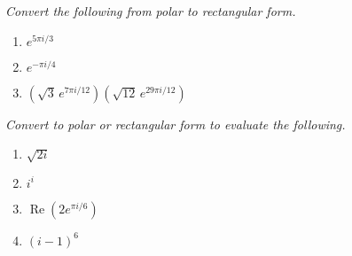 \documentclass[11pt]{article}
\newcommand{\re}{\operatorname{Re}}
\begin{document}
\noindent
\textit{Convert the following from polar to rectangular form.}
\begin{multicols}{3}
\begin{enumerate}
\setcounter{enumi}{\theenumCount}
\item $e^{5\pi i/3}$ %
\item $e^{-\pi i /4}$ %
\item $(\sqrt{3}\, e^{7\pi i /12}) (\sqrt{12}\, e^{29 \pi i/ 12})$ %
\setcounter{enumCount}{\theenumi}
\end{enumerate}
\end{multicols}
\vfill

\noindent
\textit{Convert to polar or rectangular form to evaluate the following.}
\begin{multicols}{4}
\begin{enumerate}
\setcounter{enumi}{\theenumCount}
\item $\sqrt{2i}$
\item $i^i$
\item $\re \left( 2e^{\pi i/6}\right)$
\item $(i-1)^6$
\setcounter{enumCount}{\theenumi}
\end{enumerate}
\end{multicols}
\vfill

\end{document}
